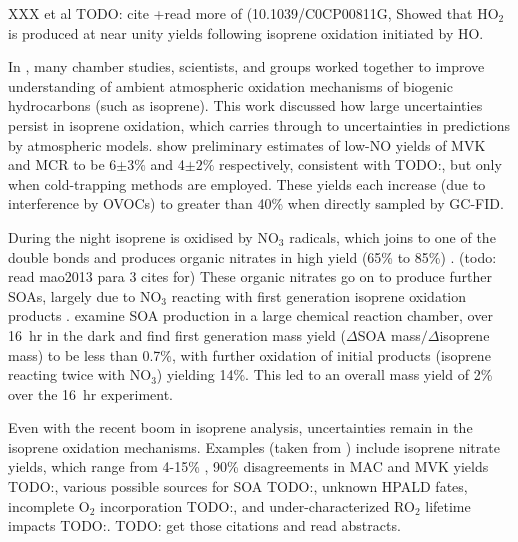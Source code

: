       XXX et al TODO: cite +read more of (10.1039/C0CP00811G, %
      Showed that HO$_2$ is produced at near unity yields following isoprene oxidation initiated by HO.
      
      In \cite{Nguyen2014}, many chamber studies, scientists, and groups worked together to improve understanding of ambient atmospheric oxidation mechanisms of biogenic hydrocarbons (such as isoprene). 
      This work discussed how large uncertainties persist in isoprene oxidation, which carries through to uncertainties in predictions by atmospheric models.
      \citet{Nguyen2014} show preliminary estimates of low-NO yields of MVK and MCR to be 6$\pm3\%$ and 4$\pm2\%$ respectively, consistent with TODO:\citet{Liu2013}, but only when cold-trapping methods are employed.
      These yields each increase (due to interference by OVOCs) to greater than 40\% when directly sampled by GC-FID.
      
      During the night isoprene is oxidised by NO$_3$ radicals, which joins to one of the double bonds and produces organic nitrates in high yield (65\% to 85\%) \citep{Mao2013}. (todo: read mao2013 para 3 cites for)
      These organic nitrates go on to produce further SOAs, largely due to NO$_3$ reacting with first generation isoprene oxidation products \citep{Rollins2009}.
      \cite{Rollins2009} examine SOA production in a large chemical reaction chamber, over 16~hr in the dark and find first generation mass yield ($\Delta$SOA mass$/\Delta$isoprene mass) to be less than 0.7\%, with further oxidation of initial products (isoprene reacting twice with NO$_3$) yielding 14\%.
      This led to an overall mass yield of 2\% over the 16~hr experiment.
      
      Even with the recent boom in isoprene analysis, uncertainties remain in the isoprene oxidation mechanisms.
	    Examples (taken from \citet{Nguyen2014}) include isoprene nitrate yields, which range from 4-15\% \citep{Paulot2009a}, 90\% disagreements in MAC and MVK yields TODO:\citep{Liu2013}, various possible sources for SOA TODO:\citep{Chan2010, Surratt2010, Lin2013}, unknown HPALD fates, incomplete O$_2$ incorporation TODO:\citep{Peeters2009,Crounse2013}, and under-characterized RO$_2$ lifetime impacts TODO:\citep{Wolfe2012}. TODO: get those citations and read abstracts.
      
